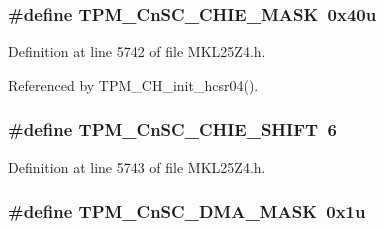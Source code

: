 \subsubsection[{\texorpdfstring{T\+P\+M\+\_\+\+Cn\+S\+C\+\_\+\+C\+H\+I\+E\+\_\+\+M\+A\+SK}{TPM_CnSC_CHIE_MASK}}]{\setlength{\rightskip}{0pt plus 5cm}\#define T\+P\+M\+\_\+\+Cn\+S\+C\+\_\+\+C\+H\+I\+E\+\_\+\+M\+A\+SK~0x40u}\hypertarget{group___t_p_m___register___masks_ga10d745a2f031a572b8d871ac2d6199a8}{}\label{group___t_p_m___register___masks_ga10d745a2f031a572b8d871ac2d6199a8}


Definition at line 5742 of file M\+K\+L25\+Z4.\+h.



Referenced by T\+P\+M\+\_\+\+C\+H\+\_\+init\+\_\+hcsr04().

\subsubsection[{\texorpdfstring{T\+P\+M\+\_\+\+Cn\+S\+C\+\_\+\+C\+H\+I\+E\+\_\+\+S\+H\+I\+FT}{TPM_CnSC_CHIE_SHIFT}}]{\setlength{\rightskip}{0pt plus 5cm}\#define T\+P\+M\+\_\+\+Cn\+S\+C\+\_\+\+C\+H\+I\+E\+\_\+\+S\+H\+I\+FT~6}\hypertarget{group___t_p_m___register___masks_ga621c521a5a2376b0685156af85a93b56}{}\label{group___t_p_m___register___masks_ga621c521a5a2376b0685156af85a93b56}


Definition at line 5743 of file M\+K\+L25\+Z4.\+h.

\subsubsection[{\texorpdfstring{T\+P\+M\+\_\+\+Cn\+S\+C\+\_\+\+D\+M\+A\+\_\+\+M\+A\+SK}{TPM_CnSC_DMA_MASK}}]{\setlength{\rightskip}{0pt plus 5cm}\#define T\+P\+M\+\_\+\+Cn\+S\+C\+\_\+\+D\+M\+A\+\_\+\+M\+A\+SK~0x1u}\hypertarget{group___t_p_m___register___masks_ga22ac77707a11ee299dc16d5a6b738739}{}\label{group___t_p_m___register___masks_ga22ac77707a11ee299dc16d5a6b738739}



